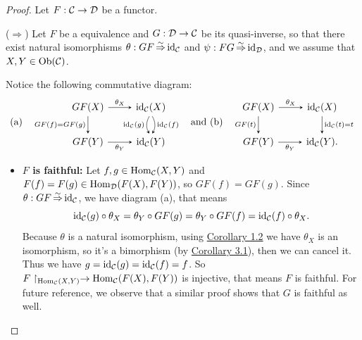 \documentclass{article}
\begin{document}
\begin{proof}
	Let $F:\mathcal{C}\to\mathcal{D}$ be a functor.
	
	($\Longrightarrow$) Let $F$ be a equivalence and $G:\mathcal{D}\to\mathcal{C}$ be its quasi-inverse, so that there exist natural isomorphisms $\theta:GF\mathop{\Rightarrow}\limits^{\sim}\mathrm{id}_{\mathcal{C}}$ and $\psi:FG\mathop{\Rightarrow}\limits^{\sim}\mathrm{id}_{\mathcal{D}}$, and we assume that $X,Y\in\mathrm{Ob}(\mathcal{C})$.
	
	Notice the following commutative diagram:
	\[\text{(a)}\quad\begin{tikzcd}
		GF(X) \arrow[->,>=stealth, d, "GF(f)=GF(g)"'] \arrow[->,>=stealth, r, "\theta_X"] &
		\id_\ca(X) \arrow[->,>=stealth, d, "\id_\ca(f)", bend left, shift right=1.5] \arrow[->,>=stealth, d, "\id_\ca(g)"', bend right, shift left=1.5]\\
		GF(Y) \arrow[->,>=stealth, r, "\theta_Y"'] & \id_\ca(Y)
	\end{tikzcd}\quad\text{and (b)}\quad\begin{tikzcd}
		GF(X) \arrow[->,>=stealth, r, "\theta_X"] \arrow[->,>=stealth, d, "GF(t)"'] &
		\id_\ca(X) \arrow[->,>=stealth, d, "\id_\ca(t)=t"]\\
		GF(Y) \arrow[->,>=stealth, r, "\theta_Y"'] & \id_\ca(Y).
	\end{tikzcd}\]
	
	\begin{itemize}
		\item {\bf $F$ is faithful:} Let $f,g\in\mathrm{Hom}_{\mathcal{C}}(X,Y)$ and $F(f)=F(g)\in\mathrm{Hom}_{\mathcal{D}}(F(X),F(Y))$, so $GF(f)=GF(g)$. Since $\theta:GF\mathop{\Rightarrow}\limits^{\sim}\mathrm{id}_{\mathcal{C}}$, we have diagram (a), that means
			$$\mathrm{id}_{\mathcal{C}}(g)\circ\theta_X=\theta_Y\circ GF(g)=\theta_Y\circ GF(f)=\mathrm{id}_{\mathcal{C}}(f)\circ\theta_X.$$
		Because $\theta$ is a natural isomorphism, using \hyperref[identity transformation]{Corollary 1.2} we have $\theta_X$ is an isomorphism, so it's a bimorphism (by \hyperref[a natural isomorphism]{Corollary 3.1}), then we can cancel it. Thus we have $g=\mathrm{id}_{\mathcal{C}}(g)=\mathrm{id}_{\mathcal{C}}(f)=f$. So $F\upharpoonright_{\mathrm{Hom}_{\mathcal{C}}(X,Y)}\to\mathrm{Hom}_{\mathcal{C}}(F(X),F(Y))$ is injective, that means $F$ is faithful. For future reference, we observe that a similar proof shows that $G$ is faithful as well.
	

\end{itemize}
\end{proof}
\end{document}
